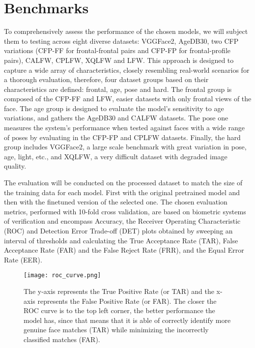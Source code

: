 \documentclass[class=report, crop=false, a4paper, 12pt]{standalone}
\begin{document}
\section{Benchmarks}
To comprehensively assess the performance of the chosen models, we will subject them to testing across eight diverse datasets: VGGFace2, AgeDB30, two CFP variations (CFP-FF for frontal-frontal pairs and CFP-FP for frontal-profile pairs), CALFW, CPLFW, XQLFW and LFW. This approach is designed to capture a wide array of characteristics, closely resembling real-world scenarios for a thorough evaluation, therefore, four dataset groups based on their characteristics are defined: frontal, age, pose and hard. The frontal group is composed of the CFP-FF and LFW, easier datasets with only frontal views of the face. The age group is designed to evaluate the model's sensitivity to age variations, and gathers the AgeDB30 and CALFW datasets. The pose one measures the system's performance when tested against faces with a wide range of poses by evaluating in the CFP-FP and CPLFW datasets. Finally, the hard group includes VGGFace2, a large scale benchmark with great variation in pose, age, light, etc., and XQLFW, a very difficult dataset with degraded image quality.  
\par The evaluation will be conducted on the processed dataset to match the size of the training data for each model. First with the original pretrained model and then with the finetuned version of the selected one. The chosen evaluation metrics, performed with 10-fold cross validation, are based on biometric systems of verification and encompass Accuracy, the Receiver Operating Characteristic (ROC) and Detection Error Trade-off (DET) plots obtained by sweeping an interval of thresholds and calculating the True Acceptance Rate (TAR), False Acceptance Rate (FAR) and the False Reject Rate (FRR), and the Equal Error Rate (EER).



\begin{figure}[!h]
  \centering
  \texttt{[image: roc\_curve.png]}
  \caption{The y-axis represents the True Positive Rate (or TAR) and the x-axis represents the False Positive Rate (or FAR). The closer the ROC curve is to the top left corner, the better performance the model has, since that means that it is able of correctly identify more genuine face matches (TAR) while minimizing the incorrectly classified matches (FAR).}
  \label{fig:roc_curve}
\end{figure}
\end{document}
